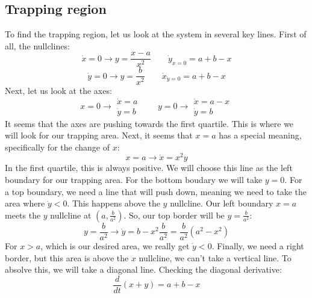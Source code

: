 \documentclass{article}
\begin{document}
\subsection{Trapping region}
To find the trapping region, let us look at the system in several key lines. First of all, the nullclines:
\begin{equation}
    \dot{x} = 0 \rightarrow y = \frac{x - a}{x^2}
    \qquad
    \dot{y}_{\dot{x} = 0} = a + b - x
\end{equation}
\begin{equation}
    \dot{y} = 0 \rightarrow y = \frac{b}{x^2}
    \qquad
    \dot{x}_{\dot{y} = 0} = a + b - x
\end{equation}
Next, let us look at the axes:
\begin{equation}
    x = 0 \rightarrow \begin{matrix}
        \dot{x} = a \\ \dot{y} = b
    \end{matrix}
    \qquad
    y = 0 \rightarrow \begin{matrix}
        \dot{x} = a - x \\ \dot{y} = b
    \end{matrix}
\end{equation}
It seems that the axes are pushing towards the first quartile. This is where we will look for our trapping area. Next, it seems that $x = a$ has a special meaning, specifically for the change of $x$:
\begin{equation}
    x = a \rightarrow \dot{x} = x^2y
\end{equation}
In the first quartile, this is always positive. We will choose this line as the left boundary for our trapping area. For the bottom boudary we will take $y = 0$. For a top boundary, we need a line that will push down, meaning we need to take the area where $\dot{y} < 0$. This happens above the $y$ nullcline. Our left boundary $x = a$ meets the $y$ nullcline at $\left(a, \frac{b}{a^2}\right)$. So, our top border will be $y = \frac{b}{a^2}$:
\begin{equation}
    y = \frac{b}{a^2} \rightarrow \dot{y} = b - x^2\frac{b}{a^2} = \frac{b}{a^2}\left(a^2 - x^2\right)
\end{equation}
For $x > a$, which is our desired area, we really get $\dot{y} < 0$. Finally, we need a right border, but this area is above the $x$ nullcline, we can't take a vertical line. To absolve this, we will take a diagonal line. Checking the diagonal derivative:
\begin{equation}
    \frac{d}{dt}(x + y) = a + b - x
\end{equation}
\end{document}
